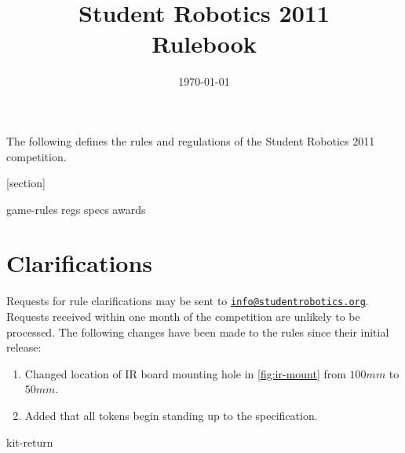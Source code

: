 \documentclass[a4paper, 12pt]{scrartcl}
\title {Student Robotics 2011\\ Rulebook}
\date{\today}
\begin{document}
\maketitle

\noindent The following defines the rules and regulations of the Student Robotics 2011 competition.

[section]
\newcommand{\rcn}{\stepcounter{rule}\arabic{section}.\arabic{rule}}
\renewcommand{\labelenumi}{\rcn}

 {game-rules}
\newpage
 {regs}
\newpage
 {specs}
\newpage
 {awards}

\renewcommand{\labelenumi}{\rcn}

\section{Clarifications}
Requests for rule clarifications may be sent to \href{mailto:info@studentrobotics.org}{\nolinkurl{info@studentrobotics.org}}.  Requests received within one month of the competition are unlikely to be processed.
The following changes have been made to the rules since their initial release:

\begin{enumerate}
\item Changed location of IR board mounting hole in \autoref{fig:ir-mount} from $100mm$ to $50mm$.
\item Added that all tokens begin standing up to the  specification.
\end{enumerate}

\newpage
\appendix
\appendixpage
\addappheadtotoc
 {kit-return}
\end{document}
